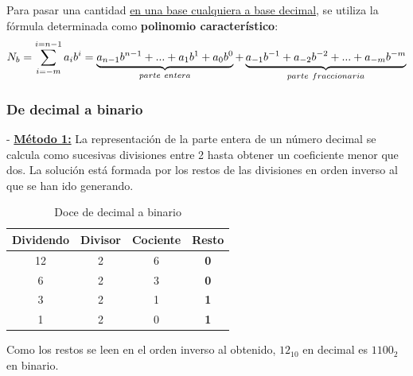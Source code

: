 \documentclass[12pt]{article}
\begin{document}
				Para pasar una cantidad \underline{en una base cualquiera a base decimal}, se utiliza la fórmula determinada como \textbf{polinomio característico}:\\
			
				\begin{equation}
					\notag
					{N}_{b} = \sum_{i=-m}^{i=n-1}{a}_{i}{b}^{i} = \underbrace{{a}_{n-1}{b}^{n-1} + ... + {a}_{1}{b}^{1} + {a}_{0}{b}^{0}}_{parte\ entera} + \underbrace{{a}_{-1}{b}^{-1} + {a}_{-2}{b}^{-2} + ... + {a}_{-m}{b}^{-m}}_{parte\ fraccionaria}
				\end{equation}
			
				\newpage
				
			\subsubsection{De decimal a binario}
			
					- \underline{\textbf{Método 1:}} La representación de la parte entera de un número decimal se calcula como sucesivas divisiones entre 2 hasta obtener un coeficiente menor que dos. La solución está formada por los restos de las divisiones en orden inverso al que se han ido generando.\\
					
						\begin{table}[H]
							\centering
							\begin{tabular}{cccc}
							Dividendo & Divisor & Cociente & \textbf{Resto} \\
							\toprule
							12 & 2 & 6 & \textbf{0} \\
							6 & 2 & 3 & \textbf{0} \\
							3 & 2 & 1 & \textbf{1} \\
							\midrule
							1 & 2 & 0 & \textbf{1} \\
							\end{tabular}
							\caption{Doce de decimal a binario}
						\end{table}
						
						Como los restos se leen en el orden inverso al obtenido, $12_{10}$ en decimal es $1100_{2}$ en binario.\\
						
\end{document}
